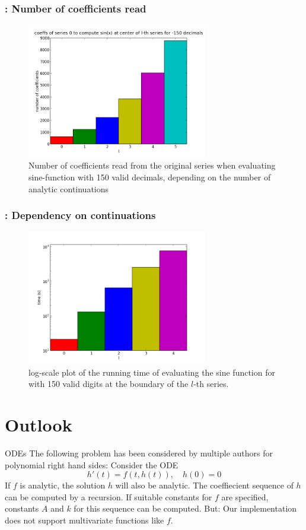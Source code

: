 \begin{frame}
  \frametitle{: Number of coefficients read}
		\begin{figure}[h]
			\centering
			\includegraphics[width=0.7\textwidth]{sin_for_coeffs_prec_150_dep_on_series.png}
			\caption{Number of coefficients read from the original series when evaluating sine-function with 150 valid decimals, depending on the number of analytic continuations}
			\label{fig:sin dep on n}
		\end{figure}
\end{frame}
\begin{frame}
  \frametitle{: Dependency on continuations}
		\begin{figure}[h]
			\centering
				\includegraphics[width=0.7\textwidth]{sin_for_n_prec_150_dep_on_series_log.png}
			\caption{log-scale plot of the running time of evaluating the sine function for \anarect with 150 valid digits at the boundary of the $l$-th series.}
			\label{fig:baana dep on series}
		\end{figure}
\end{frame}
\section{Outlook}
\begin{frame}{ODEs}
	\vfill
	The following problem has been considered by multiple authors for polynomial right hand sides:
	\vfill
	Consider the ODE
	\[ h'(t) = f(t,h(t)), \quad h(0) = 0 \]\pause
	If $f$ is analytic, the solution $h$ will also be analytic.\pause
	\vfill
	The coeffiecient sequence of $h$ can be computed by a recursion.\pause
	\vfill
	If suitable constants for $f$ are specified, constants $A$ and $k$ for this sequence can be computed.\pause
	\vfill
	But: Our implementation does not support multivariate functions like $f$.\pause
\end{frame}


